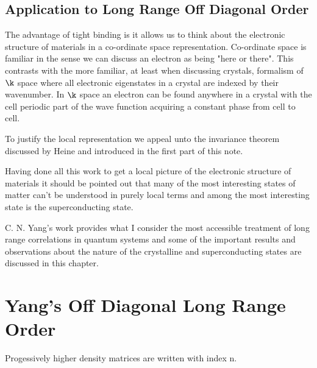 \subsection{Application to Long Range Off Diagonal Order}
The advantage of tight binding is it allows us to think about
the electronic structure of materials in a co-ordinate space representation.
Co-ordinate space is familiar in the sense we can discuss an electron as being
"here or there". This contrasts with the more familiar, at least when discussing crystals,
formalism of $\k$ space where all electronic eigenstates in a crystal are indexed by
their wavenumber. In $\k$ space an electron can be found anywhere in a crystal with the
cell periodic part of the wave function acquiring a constant phase from cell to cell.

To justify the local representation we appeal unto the invariance theorem discussed 
by Heine and introduced in the first part of this note. 

Having done all this work to get a local picture of the electronic structure of materials
it should be pointed out that many of the most interesting states of matter can't 
be understood in purely local terms and among the most interesting state is the
superconducting state.


C. N. Yang's work provides what I consider the most accessible treatment of long range
correlations in quantum systems and some of the important results and observations about
the nature of the crystalline and superconducting states are discussed in this chapter. 

\section{Yang's Off Diagonal Long Range Order}
Progessively higher density matrices are written with index n. 

